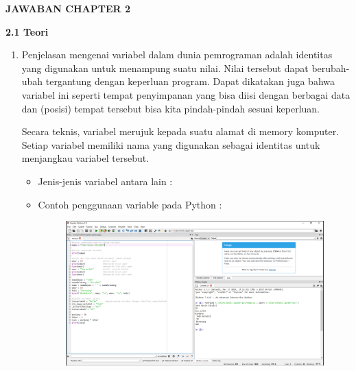 \textbf{JAWABAN CHAPTER 2}
\par
\textbf{2.1 Teori}
\begin{enumerate}
\item Penjelasan mengenai variabel dalam dunia pemrograman adalah identitas yang digunakan untuk menampung suatu nilai. Nilai tersebut dapat berubah-ubah tergantung dengan keperluan program. Dapat dikatakan juga bahwa variabel ini seperti tempat penyimpanan yang bisa diisi dengan berbagai data dan (posisi) tempat tersebut bisa kita pindah-pindah sesuai keperluan.
\par
Secara teknis, variabel merujuk kepada suatu alamat di memory komputer. Setiap variabel memiliki nama yang digunakan sebagai identitas untuk menjangkau variabel tersebut.

\begin{itemize}
    \item Jenis-jenis variabel antara lain :
    
    \item Contoh penggunaan variable pada Python :
\begin{figure}[htbp!]
	\centering
	\includegraphics[width=10cm]{figures/cv.PNG}
	\label{fig:gambar}
	\end{figure}
\end{itemize}
\end{enumerate}